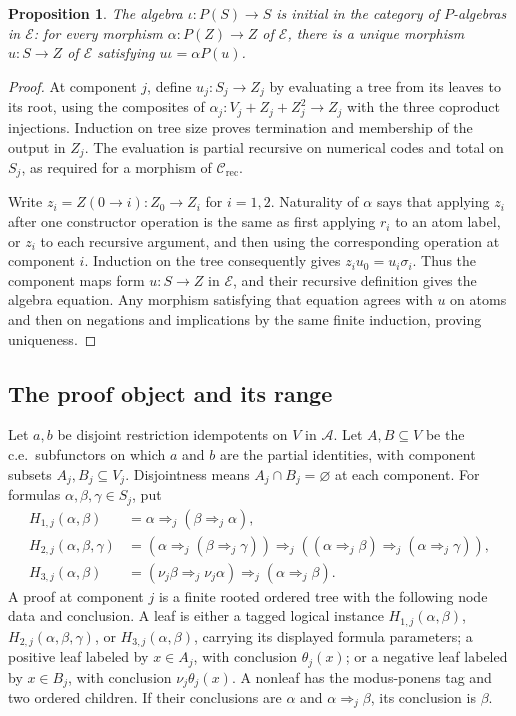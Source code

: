 \documentclass[11pt]{article}
\newtheorem{proposition}[theorem]{Proposition}
\begin{document}
\begin{proposition}\label{prop:fork-syntax-initial}
The algebra $\iota:P(S)\to S$ is initial in the category of
$P$-algebras in $\mathcal E$: for every morphism
$\alpha:P(Z)\to Z$ of $\mathcal E$, there is a unique morphism
$u:S\to Z$ of $\mathcal E$ satisfying $u\iota=\alpha P(u)$.
\end{proposition}
\begin{proof}
At component $j$, define $u_j:S_j\to Z_j$ by evaluating a tree
from its leaves to its root, using the composites of
$\alpha_j:V_j+Z_j+Z_j^2\to Z_j$ with the three coproduct injections.
Induction on tree size proves termination and membership
of the output in $Z_j$. The evaluation is partial recursive on
numerical codes and total on $S_j$, as required for a morphism of
$\mathcal C_{\mathrm{rec}}$.

Write $z_i=Z(0\to i):Z_0\to Z_i$ for $i=1,2$. Naturality of
$\alpha$ says that applying $z_i$ after one constructor operation
is the same as first applying $r_i$ to an atom label, or $z_i$
to each recursive argument, and then using the corresponding
operation at component $i$. Induction on the tree consequently
gives $z_i u_0=u_i\sigma_i$. Thus the component maps form
$u:S\to Z$ in $\mathcal E$, and their recursive definition gives
the algebra equation. Any morphism satisfying that equation agrees
with $u$ on atoms and then on negations and implications by the
same finite induction, proving uniqueness.
\end{proof}

\subsection{The proof object and its range}

Let $a,b$ be disjoint restriction idempotents on $V$ in $\mathcal A$.
Let $A,B\subseteq V$ be the c.e.\ subfunctors on which
$a$ and $b$ are the partial identities, with component subsets
$A_j,B_j\subseteq V_j$. Disjointness
means $A_j\cap B_j=\varnothing$ at each component.
For formulas $\alpha,\beta,\gamma\in S_j$, put
\begin{align*}
 H_{1,j}(\alpha,\beta)
   &=\alpha\Rightarrow_j(\beta\Rightarrow_j\alpha),\\
 H_{2,j}(\alpha,\beta,\gamma)
   &=(\alpha\Rightarrow_j(\beta\Rightarrow_j\gamma))
     \Rightarrow_j((\alpha\Rightarrow_j\beta)
                          \Rightarrow_j(\alpha\Rightarrow_j\gamma)),\\
 H_{3,j}(\alpha,\beta)
   &=(\nu_j\beta\Rightarrow_j\nu_j\alpha)
                          \Rightarrow_j(\alpha\Rightarrow_j\beta).
\end{align*}
A proof at component $j$ is a finite rooted ordered tree with
the following node data and conclusion. A leaf is either a
tagged logical instance $H_{1,j}(\alpha,\beta)$,
$H_{2,j}(\alpha,\beta,\gamma)$, or
$H_{3,j}(\alpha,\beta)$, carrying its displayed formula
parameters; a positive leaf labeled by $x\in A_j$, with
conclusion $\theta_j(x)$; or a negative leaf labeled by
$x\in B_j$, with conclusion $\nu_j\theta_j(x)$.
A nonleaf has the modus-ponens tag and two ordered children.
If their conclusions are $\alpha$ and
$\alpha\Rightarrow_j\beta$, its conclusion is $\beta$.
\end{document}

